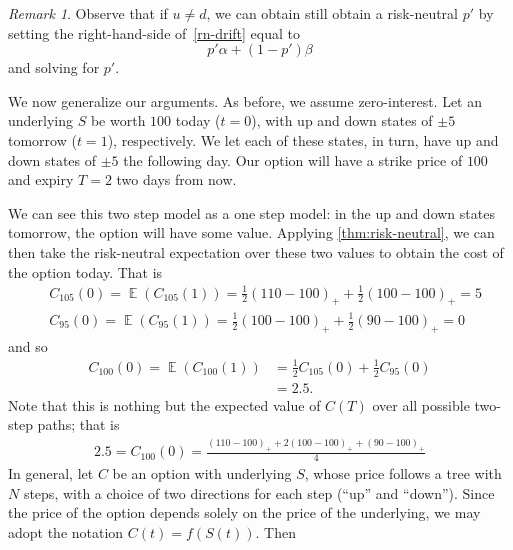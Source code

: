 \documentclass[12pt]{article}
\DeclareMathOperator{\ex}{\mathbb{E}}
\theoremstyle{plain}
\theoremstyle{definition}
\theoremstyle{remark}
\newtheorem*{remark}{Remark}
\numberwithin{equation}{section}  %
\begin{document}
\begin{framed}
\begin{remark}
	Observe that if $u \neq d$, we can obtain still obtain a risk-neutral $p'$
	by setting the right-hand-side of~\eqref{rn-drift} equal to 
	\[p' \alpha + (1-p')\beta \] and solving for $p'$. 
\end{remark}
\end{framed}
We now generalize our arguments. 
As before, we assume zero-interest. Let an underlying $S$ be worth
$100$ today ($t=0$), with up and down states of $\pm 5$ tomorrow ($t=1$), respectively.  We let each of these states, in turn, have up and down states of
$\pm 5$ the following day. Our option will have a strike price of $100$
and expiry $T = 2$ two days from now. 

We can see this two step model as a one step model: in the up and down states
tomorrow, the option will have some value. Applying 
\cref{thm:risk-neutral}, we can then take the risk-neutral 
expectation over these two values to obtain the cost of the option today.
That is
\begin{equation*}
	\begin{split}
		& C_{105}(0) = \ex(C_{105}(1)) = \frac{1}{2}{(110 - 100)}_{+} +
		\frac{1}{2}{(100 - 100)}_{+} = 5
		\\
		& C_{95}(0) = \ex(C_{95}(1)) = \frac{1}{2}{(100 - 100)}_{+} +
		\frac{1}{2}{(90 - 100)}_{+} = 0
	\end{split}
\end{equation*}
and so
\begin{equation*}
	\begin{split}
		C_{100}(0) = \ex(C_{100}(1))
		& = \frac{1}{2}C_{105}(0) + \frac{1}{2} C_{95}(0)
		\\
		& = 2.5.
	\end{split}
\end{equation*}
Note that this is nothing but the expected value
of $C(T)$ over all possible two-step paths; that is
\begin{equation*}
	\begin{split}
		2.5 = C_{100}(0) = \frac{{(110-100)}_{+} + 2 {(100 - 100)}_{+} + {(90 - 100)}_{+}}{4}
	\end{split}
\end{equation*}
In general, let $C$ be an option with underlying $S$, whose price follows
a tree with $N$ steps, with a choice of two
directions for each step (``up'' and ``down'').
Since the price of the option depends solely on the price of the
underlying, we may adopt the notation $C(t) = f(S(t))$. Then
\end{document}
